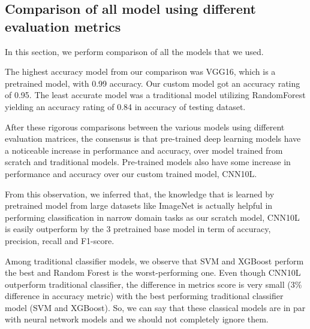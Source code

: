 
\subsection{Comparison of all model using different evaluation metrics}
 In this section, we perform comparison of all the models that we used.
 \par\vspace{1em}
 The highest accuracy model from our comparison was VGG16, which is a pretrained model, with 0.99 accuracy. Our custom model got an accuracy rating of 0.95. The least accurate model was a traditional model utilizing RandomForest yielding an accuracy rating of 0.84 in accuracy of testing dataset.
 \par\vspace{1em}
 
After these rigorous comparisons between the various models using different evaluation matrices, the consensus is that pre-trained deep learning models have a noticeable increase in performance and accuracy, over model trained from scratch and  traditional models. Pre-trained models also have some increase in performance and accuracy over our custom trained model, CNN10L.\par \vspace{1em}

From this observation, we inferred that, the knowledge that is learned by pretrained model from large datasets like ImageNet is actually helpful in performing classification in narrow domain tasks as our scratch model, CNN10L is easily outperform by the 3 pretrained base model in term of accuracy, precision, recall and F1-score.
\par\vspace{1em}
Among traditional classifier models, we observe that SVM and XGBoost perform the best and Random Forest is the worst-performing one. Even though CNN10L outperform  traditional classifier, the difference in metrics score is very small (3\% difference in accuracy metric) with the best performing traditional classifier model (SVM and XGBoost). So, we can say that these classical models are in par with neural network models and we should not completely ignore them. 
\par\vspace{1em}



